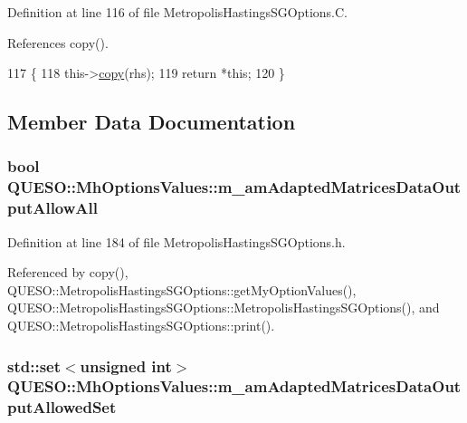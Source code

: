 Definition at line 116 of file Metropolis\-Hastings\-S\-G\-Options.\-C.



References copy().


\begin{DoxyCode}
117 \{
118   this->\hyperlink{class_q_u_e_s_o_1_1_mh_options_values_a1baa18f8753ff26488e5b249775130e4}{copy}(rhs);
119   \textcolor{keywordflow}{return} *\textcolor{keyword}{this};
120 \}
\end{DoxyCode}


\subsection{Member Data Documentation}
\hypertarget{class_q_u_e_s_o_1_1_mh_options_values_aa149885c0a566a853626ddae4a31f313}{
\subsubsection[{m\-\_\-am\-Adapted\-Matrices\-Data\-Output\-Allow\-All}]{\setlength{\rightskip}{0pt plus 5cm}bool Q\-U\-E\-S\-O\-::\-Mh\-Options\-Values\-::m\-\_\-am\-Adapted\-Matrices\-Data\-Output\-Allow\-All}}\label{class_q_u_e_s_o_1_1_mh_options_values_aa149885c0a566a853626ddae4a31f313}


Definition at line 184 of file Metropolis\-Hastings\-S\-G\-Options.\-h.



Referenced by copy(), Q\-U\-E\-S\-O\-::\-Metropolis\-Hastings\-S\-G\-Options\-::get\-My\-Option\-Values(), Q\-U\-E\-S\-O\-::\-Metropolis\-Hastings\-S\-G\-Options\-::\-Metropolis\-Hastings\-S\-G\-Options(), and Q\-U\-E\-S\-O\-::\-Metropolis\-Hastings\-S\-G\-Options\-::print().

\hypertarget{class_q_u_e_s_o_1_1_mh_options_values_a5e9c6606269be17f3f7627f1b065b864}{
\subsubsection[{m\-\_\-am\-Adapted\-Matrices\-Data\-Output\-Allowed\-Set}]{\setlength{\rightskip}{0pt plus 5cm}std\-::set$<$unsigned int$>$ Q\-U\-E\-S\-O\-::\-Mh\-Options\-Values\-::m\-\_\-am\-Adapted\-Matrices\-Data\-Output\-Allowed\-Set}}\label{class_q_u_e_s_o_1_1_mh_options_values_a5e9c6606269be17f3f7627f1b065b864}


